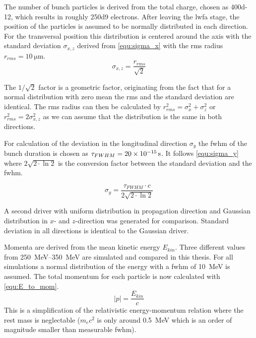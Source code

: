 \documentclass[bachelor_thesis]{subfiles}
\begin{document}
The number of bunch particles is derived from the total charge, chosen as \qty{400d-12}{\C}, which results in roughly \num{250d9} electrons. After leaving the \gls{lwfa} stage, the position of the particles is assumed to be normally distributed in each direction.
For the transversal position this distribution is centered around the axis with the standard deviation $\sigma_{x,z}$ derived from \autoref{equ:sigma_x} with the \gls{rms} radius $r_{rms}=\qty{10}{\um}$.
\begin{equation}
	\sigma_{x,z}=\frac{r_{rms}}{\sqrt{2}} 
	\label{equ:sigma_x}
\end{equation}

The $1/\sqrt{2}$ factor is a geometric factor, originating from the fact that for a normal distribution with zero mean the \gls{rms} and the standard deviation are identical. 
The \gls{rms} radius can then be calculated by $r_{rms}^2=\sigma_{x}^2 + \sigma_{z}^2$ or $r_{rms}^2=2\sigma_{x,z}^2$ as we can assume that the distribution is the same in both directions.

For calculation of the deviation in the longitudinal direction $\sigma_y$ the \gls{fwhm} of the bunch duration is chosen as $\tau_{FWHM}=\qty{20d-15}{\s}$. 
It follows \autoref{equ:sigma_y} where $2\sqrt{2\cdot\ln{2}}$ is the conversion factor between the standard deviation and the \gls{fwhm}.

\begin{equation}
	\sigma_{y}=\frac{\tau_{FWHM}\cdot c}{2\sqrt{2\cdot\ln{2}}}
	\label{equ:sigma_y}
\end{equation}

A second driver with uniform distribution in propagation direction and Gaussian distribution in $x$- and $z$-direction was generated for comparison. Standard deviation in all directions is identical to the Gaussian driver.

Momenta are derived from the mean kinetic energy $E_{kin}$. Three different values from \qtyrange{250}{350}{\MeV} are simulated and compared in this thesis.
For all simulations a normal distribution of the energy with a \gls{fwhm} of \qty{10}{\MeV} is assumed. The total momentum for each particle is now calculated with \autoref{equ:E_to_mom}.
\begin{equation}
	\left|p\right|=\frac{E_{kin}}{c}
	\label{equ:E_to_mom}
\end{equation}
This is a simplification of the relativistic energy-momentum relation where the rest mass is neglectable ($m_{e}c^2$ is only around \qty{0.5}{\MeV} which is an order of magnitude smaller than measurable \gls{fwhm}).
\end{document}
